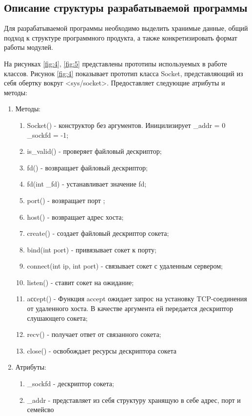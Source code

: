 \subsection{Описание структуры разрабатываемой программы}
Для разрабатываемой программы необходимо выделить хранимые данные, общий подход к структуре программного продукта, а также конкретизировать формат работы 
модулей.

На рисунках \ref{fig:4}, \ref{fig:5} представлены прототипы используемых в работе классов. 
Рисунок \ref{fig:4} показывает прототип класса Socket, представляющий из себя обертку вокруг <sys/socket>. 
Предоставляет следующие атрибуты и методы:
\begin{enumerate}
	\item Методы: \begin{enumerate}
		\item Socket() - конструктор без аргументов. Иницилизирует \_addr = 0 \_sockfd = -1;
		\item is\_valid() - проверяет файловый дескриптор;
		\item fd() - возвращает файловый дескриптор;
		\item fd(int \_fd) - устанавливает значение fd;
		\item port() - возвращает порт ;
		\item host() - возвращает адрес хоста;
		\item create() - создает файловый дескриптор сокета;
		\item bind(int port) - привязывает сокет к порту;
		\item connect(int ip, int port) - связывает сокет с удаленным сервером;
		\item listen() - ставит сокет на ожидание;
		\item aссept() - Функция accept ожидает запрос на установку TCP-соединения от удаленного хоста. В качестве аргумента ей передается дескриптор слушающего сокета;
		\item recv() - получает ответ от связанного сокета;
		\item close() - освобождает ресурсы дескриптора сокета
	\end{enumerate}
	\item Атрибуты:
		\begin{enumerate}
			\item \_sockfd - дескриптор сокета;
			\item \_addr - представляет из себя структуру хранящую в себе адрес, порт и семейсво
		\end{enumerate}
\end{enumerate}


